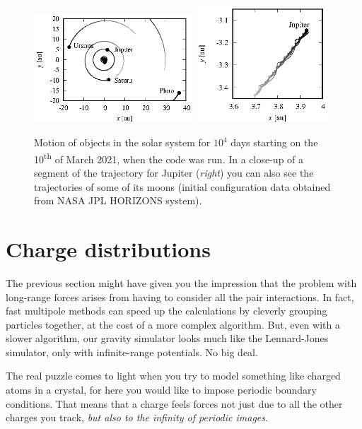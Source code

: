 \begin{figure}
  \begin{center}
  \includegraphics[width = 0.53\textwidth]{figures/gravity.eps}
  \includegraphics[width = 0.44\textwidth]{figures/Jupiter.eps}
  \end{center}
  \caption{\label{gravity}Motion of objects in the solar system for $10^4$ days 
           starting on the 10\textsuperscript{th} of March 2021, when the code 
           was run. In a close-up of a segment of the trajectory for Jupiter 
           (\textit{right}) you can also see the trajectories of some of its 
           moons (initial configuration data obtained from NASA JPL HORIZONS 
           system).}
\end{figure}

\section{Charge distributions}

The previous section might have given you the impression that the problem with 
long-range forces arises from having to consider all the pair interactions. In 
fact, fast multipole methods can speed up the calculations by cleverly grouping 
particles together, at the cost of a more complex algorithm. But, even with a 
slower algorithm, our gravity simulator looks much like the Lennard-Jones 
simulator, only with infinite-range potentials. No big deal.

The real puzzle comes to light when you try to model something like charged 
atoms in a crystal, for here you would like to impose periodic boundary 
conditions. That means that a charge feels forces not just due to all the other 
charges you track, \textit{but also to the infinity of periodic images}.

